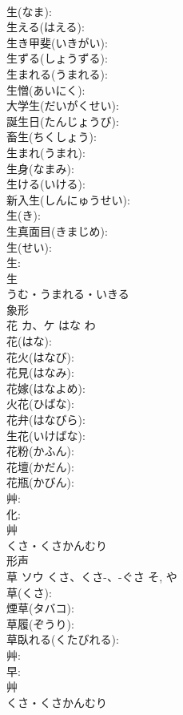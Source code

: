 \documentclass[8pt]{extreport}
\begin{document}
\begin{CJK}{UTF8}{min}
\\	生(なま): 
\\	生える(はえる): 
\\	生き甲斐(いきがい): 
\\	生ずる(しょうずる): 
\\	生まれる(うまれる): 
\\	生憎(あいにく): 
\\	大学生(だいがくせい): 
\\	誕生日(たんじょうび): 
\\	畜生(ちくしょう): 
\\	生まれ(うまれ): 
\\	生身(なまみ): 
\\	生ける(いける): 
\\	新入生(しんにゅうせい): 
\\	生(き): 
\\	生真面目(きまじめ): 
\\	生(せい): 
\\	生: 
\\	生	
\\	うむ・うまれる・いきる	
\\	象形 
\\	花	カ、ケ	はな	わ	
\\	花(はな): 
\\	花火(はなび): 
\\	花見(はなみ): 
\\	花嫁(はなよめ): 
\\	火花(ひばな): 
\\	花弁(はなびら): 
\\	生花(いけばな): 
\\	花粉(かふん): 
\\	花壇(かだん): 
\\	花瓶(かびん): 
\\	艸: 
\\	化: 
\\	艸	
\\	くさ・くさかんむり	
\\	形声 
\\	草	ソウ	くさ、くさ-、-ぐさ	そ, や	
\\	草(くさ): 
\\	煙草(タバコ): 
\\	草履(ぞうり): 
\\	草臥れる(くたびれる): 
\\	艸: 
\\	早: 
\\	艸	
\\	くさ・くさかんむり	

\end{CJK}
\end{document}
